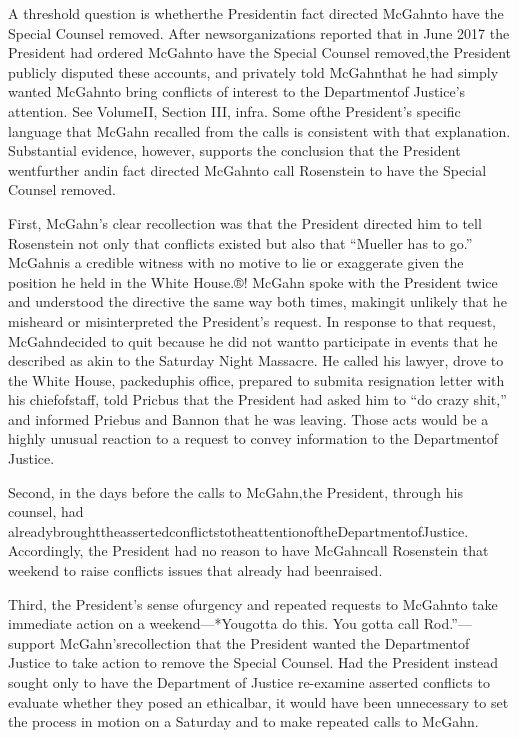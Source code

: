 {A threshold question is whetherthe Presidentin fact directed McGahnto have the Special Counsel removed. After newsorganizations reported that in June 2017 the President had ordered McGahnto have the Special Counsel removed,the President publicly disputed these accounts, and privately told McGahnthat he had simply wanted McGahnto bring conflicts of interest to the Departmentof Justice’s attention. See VolumeII, Section III, infra. Some ofthe President’s specific language that McGahn recalled from the calls is consistent with that explanation. Substantial evidence, however, supports the conclusion that the President wentfurther andin fact directed McGahnto call Rosenstein to have the Special Counsel removed.

First, McGahn’s clear recollection was that the President directed him to tell Rosenstein not only that conflicts existed but also that “Mueller has to go.” McGahnis a credible witness with no motive to lie or exaggerate given the position he held in the White House.®! McGahn spoke with the President twice and understood the directive the same way both times, makingit unlikely that he misheard or misinterpreted the President’s request. In response to that request, McGahndecided to quit because he did not wantto participate in events that he described as akin to the Saturday Night Massacre. He called his lawyer, drove to the White House, packeduphis office, prepared to submita resignation letter with his chiefofstaff, told Pricbus that the President had asked him to “do crazy shit,” and informed Priebus and Bannon that he was leaving. Those acts would be a highly unusual reaction to a request to convey information to the Departmentof Justice.

Second, in the days before the calls to McGahn,the President, through his counsel, had alreadybroughttheassertedconflictstotheattentionoftheDepartmentofJustice. Accordingly, the President had no reason to have McGahncall Rosenstein that weekend to raise conflicts issues that already had beenraised.

Third, the President’s sense ofurgency and repeated requests to McGahnto take immediate action on a weekend—*Yougotta do this. You gotta call Rod.”—support McGahn’srecollection that the President wanted the Departmentof Justice to take action to remove the Special Counsel. Had the President instead sought only to have the Department of Justice re-examine asserted conflicts to evaluate whether they posed an ethicalbar, it would have been unnecessary to set the process in motion on a Saturday and to make repeated calls to McGahn.

}
